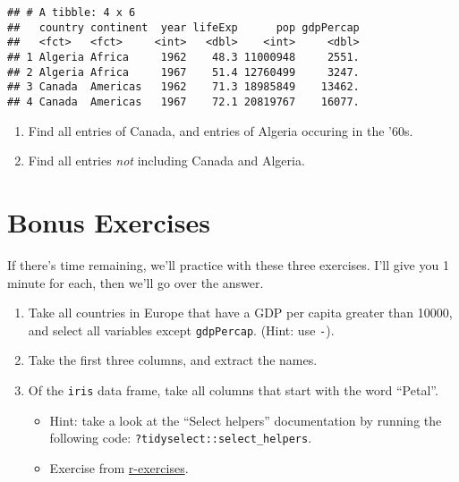 \documentclass[]{article}
\newenvironment{Shaded}{\begin{snugshade}}{\end{snugshade}}
\newcommand{\KeywordTok}[1]{\textcolor[rgb]{0.13,0.29,0.53}{\textbf{{#1}}}}
\newcommand{\DecValTok}[1]{\textcolor[rgb]{0.00,0.00,0.81}{{#1}}}
\newcommand{\StringTok}[1]{\textcolor[rgb]{0.31,0.60,0.02}{{#1}}}
\newcommand{\NormalTok}[1]{{#1}}
\providecommand{\tightlist}{%
  \setlength{\itemsep}{0pt}\setlength{\parskip}{0pt}}
\begin{document}
\begin{Shaded}
\end{Shaded}

\begin{verbatim}
## # A tibble: 4 x 6
##   country continent  year lifeExp      pop gdpPercap
##   <fct>   <fct>     <int>   <dbl>    <int>     <dbl>
## 1 Algeria Africa     1962    48.3 11000948     2551.
## 2 Algeria Africa     1967    51.4 12760499     3247.
## 3 Canada  Americas   1962    71.3 18985849    13462.
## 4 Canada  Americas   1967    72.1 20819767    16077.
\end{verbatim}

\begin{enumerate}
\def\labelenumi{\arabic{enumi}.}
\setcounter{enumi}{1}
\tightlist
\item
  Find all entries of Canada, and entries of Algeria occuring in the
  '60s.
\item
  Find all entries \emph{not} including Canada and Algeria.
\end{enumerate}

\section{Bonus Exercises}\label{bonus-exercises}

If there's time remaining, we'll practice with these three exercises.
I'll give you 1 minute for each, then we'll go over the answer.

\begin{enumerate}
\def\labelenumi{\arabic{enumi}.}
\item
  Take all countries in Europe that have a GDP per capita greater than
  10000, and select all variables except \texttt{gdpPercap}. (Hint: use
  \texttt{-}).
\item
  Take the first three columns, and extract the names.
\item
  Of the \texttt{iris} data frame, take all columns that start with the
  word ``Petal''.

  \begin{itemize}
  \tightlist
  \item
    Hint: take a look at the ``Select helpers'' documentation by running
    the following code: \texttt{?tidyselect::select\_helpers}.
  \item
    Exercise from
    \href{https://www.r-exercises.com/2017/10/19/dplyr-basic-functions-exercises/}{r-exercises}.
  \end{itemize}
\end{enumerate}
\end{document}
